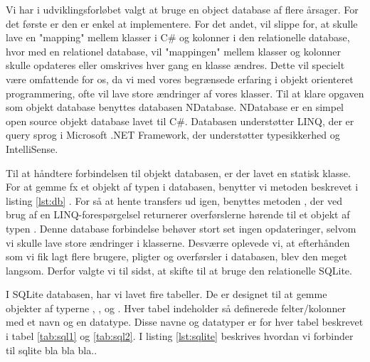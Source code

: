 Vi har i udviklingsforløbet valgt at bruge en object database af flere årsager. For det første er den er enkel at implementere. For det andet, vil slippe for, at skulle lave en "mapping" mellem klasser i C\# og kolonner i den relationelle database, hvor med en relationel database, vil "mappingen" mellem klasser og kolonner skulle opdateres eller omskrives hver gang en klasse ændres. Dette vil specielt være omfattende for os, da vi med vores begrænsede erfaring i objekt orienteret programmering, ofte vil lave store ændringer af vores klasser.
Til at klare opgaven som objekt database benyttes databasen NDatabase. NDatabase er en simpel open source objekt database lavet til C\#. Databasen understøtter LINQ, der er query sprog i Microsoft .NET Framework, der understøtter typesikkerhed og IntelliSense\cite{linqdok}.

Til at håndtere forbindelsen til objekt databasen, er der lavet en statisk klasse. For at gemme fx et objekt af typen  i databasen, benytter vi  metoden beskrevet i listing \ref{lst:db} . For så at hente transfers ud igen, benyttes metoden , der ved brug af en LINQ-forespørgelsel returnerer overførslerne hørende til et objekt af typen . Denne database forbindelse behøver stort set ingen opdateringer, selvom vi skulle lave store ændringer i klasserne.
Desværre oplevede vi, at efterhånden som vi fik lagt flere brugere, pligter og overførsler i databasen, blev den meget langsom. Derfor valgte vi til sidst, at skifte til at bruge den relationelle SQLite.


I SQLite databasen, har vi lavet fire tabeller. De er designet til at gemme objekter af typerne , ,  og . Hver tabel indeholder så definerede felter/kolonner med et navn og en datatype. Disse navne og datatyper er for hver tabel beskrevet i tabel \ref{tab:sql1} og \ref{tab:sql2}. 
I listing \ref{lst:sqlite} beskrives hvordan vi forbinder til sqlite bla bla bla..

\newcommand{\cent}[1]{\hspace*{\fill}#1\hspace*{\fill}}
 
